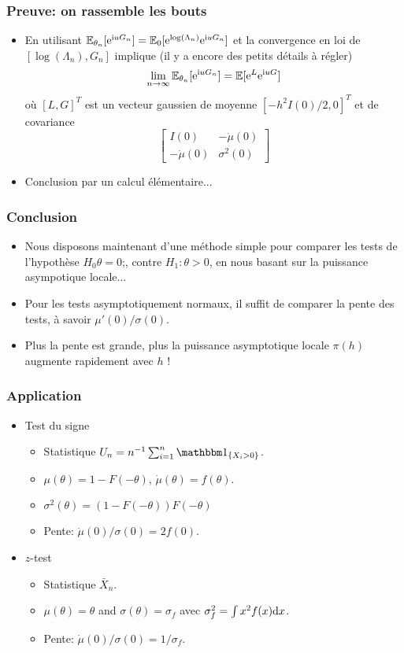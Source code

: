 \begin{frame}
\frametitle{Preuve: on rassemble les bouts}
\begin{itemize}
\item En utilisant $\operatorname{{\mathbb E}}_{\theta_n}[ \mathrm{e}^{\mathrm{i} u G_n}] = \operatorname{{\mathbb E}}_0[ \mathrm{e}^{\log(\Lambda_n)} \mathrm{e}^{\mathrm{i} u G_n}]$ et
la convergence en loi de $[\log(\Lambda_n), G_n]$ implique (il y a encore des petits détails à régler)
\[
\lim_{n \to \infty} \operatorname{{\mathbb E}}_{\theta_n}[ \mathrm{e}^{\mathrm{i} u G_n}]= \operatorname{{\mathbb E}}[ \mathrm{e}^{L} \mathrm{e}^{\mathrm{i} u G}]
\]
où $[L,G]^T$ est un vecteur gaussien de moyenne $[-h^2 I(0)/2,0]^T$ et de covariance
\[
\left[
\begin{array}{cc}
I(0) & -\dot \mu(0) \\
-\dot \mu(0) & \sigma^2(0)
\end{array}
\right]
\]
\item Conclusion par un calcul élémentaire...
\end{itemize}
\end{frame}

\begin{frame}
\frametitle{Conclusion}
\begin{itemize}
\item Nous disposons maintenant d'une méthode simple pour comparer les tests de l'hypothèse $H_0 \theta = 0$;, contre $H_1: \theta > 0$, en nous basant sur la puissance asympotique locale...
\item Pour les tests asymptotiquement normaux, il suffit de comparer la \alert{pente} des tests, à savoir \alert{$\mu'(0)/\sigma(0)$}.
\item Plus la pente est grande, plus la puissance asymptotique locale $\pi(h)$ augmente rapidement avec $h$ !
\end{itemize}
\end{frame}


\begin{frame}
\frametitle{Application}
\begin{itemize}
\item Test du signe
\begin{itemize}
\item Statistique $U_n= n^{-1} \sum_{i=1}^n \indi{X_i > 0}$.
\item $\mu(\theta)= 1 - F(-\theta)$, $\dot \mu(\theta)=  f(\theta)$.
\item $\sigma^2(\theta)= (1 - F(-\theta)) F(-\theta)$
\item \alert{Pente:} $\dot\mu(0)/\sigma(0)= 2 f(0)$.
\end{itemize}
\item $z$-test
\begin{itemize}
\item Statistique $\bar{X}_n$.
\item $\mu(\theta)= \theta$ and $\sigma(\theta)= \sigma_f$ avec $\sigma^2_f = \int x^2 f(x) \mathrm{d} x$.
\item \alert{Pente:} $\dot\mu(0)/\sigma(0)= 1/\sigma_f$.
\end{itemize}
\end{itemize}
\end{frame}


